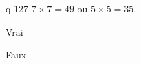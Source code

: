 \begin{truefalse}{q-127}
$7\times 7 = 49$ ou $5\times 5 = 35$.
\item* Vrai
\item Faux
\end{truefalse}

